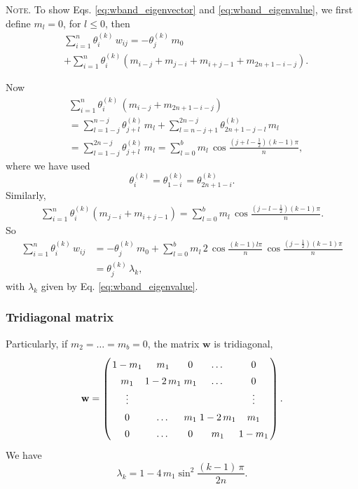 \documentclass[reprint]{revtex4-1}
\newcommand{\note}[1]{{\color{DarkGreen}\footnotesize \textsc{Note.} #1}}
\begin{document}
\note{To show Eqs.
  \eqref{eq:wband_eigenvector} and \eqref{eq:wband_eigenvalue},
  we first define $m_l = 0$, for $l \le 0$, then
$$
\begin{aligned}
&\sum_{i = 1}^n
  \theta^{(k)}_i
  \, w_{ij}
=
- \theta^{(k)}_j \, m_0
\\
&
+\sum_{i=1}^n
  \theta^{(k)}_i
  \left(
    m_{i - j} + m_{j - i} + m_{i + j - 1} + m_{2n+1-i-j}
  \right)
.
\end{aligned}
$$

Now
$$
\begin{aligned}
  &
  \sum_{i=1}^n
  \theta^{(k)}_i \,
  \left(
    m_{i - j} + m_{2n+1-i-j}
  \right)
  \\
  &=
  \sum_{l=1-j}^{n-j} \theta^{(k)}_{j+l} \, m_l
  +
  \sum_{l=n-j+1}^{2n-j} \theta^{(k)}_{2n+1-j-l} \, m_l
  \\
  &=
  \sum_{l=1-j}^{2n-j} \theta^{(k)}_{j+l} \, m_l
  =
  \sum_{l=0}^{b} m_l \, \cos\frac{(j+l-\frac12)(k-1)\pi}{n},
\end{aligned}
$$
where we have used
$$
\theta^{(k)}_i = \theta^{(k)}_{1-i} = \theta^{(k)}_{2n+1-i}.
$$
Similarly,
$$
\begin{aligned}
  \sum_{i=1}^n
  \theta^{(k)}_i
  \left(
    m_{j - i} + m_{i+j-1}
  \right)
  =
  \sum_{l=0}^{b} m_l \, \cos\frac{(j-l-\frac12)(k-1)\pi}{n}.
\end{aligned}
$$
%
So
$$
\begin{aligned}
\sum_{i = 1}^n \theta^{(k)}_i \, w_{ij}
&=
- \theta^{(k)}_j \, m_0
+\sum_{l=0}^{b} m_l \, 2 \, \cos\frac{(k-1)l\pi}{n} \, \cos\frac{(j-\frac12)(k-1)\pi}{n}
\\
&= \theta^{(k)}_j \, \lambda_k,
\end{aligned}
$$
with $\lambda_k$ given by Eq. \eqref{eq:wband_eigenvalue}.
}
%



\subsubsection{Tridiagonal matrix}



Particularly, if $m_2 = \dots = m_b = 0$,
the matrix $\mathbf w$ is tridiagonal,
%
\begin{equation}
\arraycolsep=1.4pt\def\arraystretch{1.4}
\mathbf w
=
\left(
  \begin{array}{cccccccc}
    1 - m_1   & m_1 & 0 & \dots & 0 \\
    m_1 & 1 - 2 \, m_1  & m_1 & \dots & 0 \\
    \vdots & &  & & \vdots \\
    0 & \dots & m_1 & 1 - 2 \, m_1  & m_1 \\
    0 & \dots & 0 & m_1 & 1 - m_1
  \end{array}
\right).
\label{eq:wtridiag}
\end{equation}
%
We have
\begin{equation}
  \lambda_k = 1 - 4 \, m_1 \sin^2 \frac{(k - 1) \, \pi}{2n}.
\label{eq:wtridiag_eigenvalue}
\end{equation}
\end{document}
